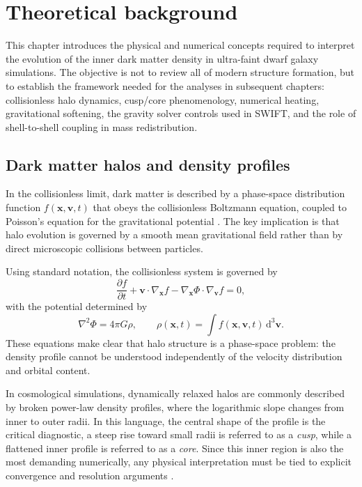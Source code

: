 \chapter{Theoretical background}

This chapter introduces the physical and numerical concepts required to interpret the evolution of the inner dark matter density in ultra-faint dwarf galaxy simulations. The objective is not to review all of modern structure formation, but to establish the framework needed for the analyses in subsequent chapters: collisionless halo dynamics, cusp/core phenomenology, numerical heating, gravitational softening, the gravity solver controls used in SWIFT, and the role of shell-to-shell coupling in mass redistribution.

\section{Dark matter halos and density profiles}
\label{sec:bg_halos_profiles}

In the collisionless limit, dark matter is described by a phase-space distribution function $f(\mathbf{x},\mathbf{v},t)$ that obeys the collisionless Boltzmann equation, coupled to Poisson's equation for the gravitational potential \citep{binney2008galactic}. The key implication is that halo evolution is governed by a smooth mean gravitational field rather than by direct microscopic collisions between particles.

Using standard notation, the collisionless system is governed by
\begin{equation}
\frac{\partial f}{\partial t} + \mathbf{v}\cdot\nabla_{\mathbf{x}} f - \nabla_{\mathbf{x}}\Phi\cdot\nabla_{\mathbf{v}} f = 0,
\end{equation}
with the potential determined by
\begin{equation}
\nabla^2 \Phi = 4\pi G\rho, \qquad \rho(\mathbf{x},t) = \int f(\mathbf{x},\mathbf{v},t)\,\mathrm{d}^3\mathbf{v}.
\end{equation}
These equations make clear that halo structure is a phase-space problem: the density profile cannot be understood independently of the velocity distribution and orbital content.

In cosmological simulations, dynamically relaxed halos are commonly described by broken power-law density profiles, where the logarithmic slope changes from inner to outer radii. In this language, the central shape of the profile is the critical diagnostic, a steep rise toward small radii is referred to as a \emph{cusp}, while a flattened inner profile is referred to as a \emph{core}. Since this inner region is also the most demanding numerically, any physical interpretation must be tied to explicit convergence and resolution arguments \citep{power2003inner}.

